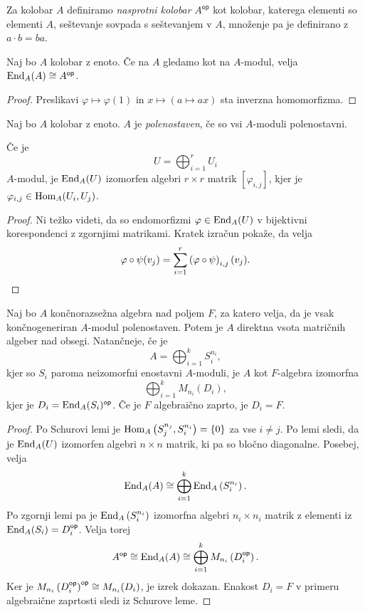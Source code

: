 \begin{definicija}
Za kolobar $A$ definiramo
\emph{nasprotni kolobar} $A^{\mathsf{op}}$
kot kolobar, katerega elementi so elementi $A$, seštevanje sovpada
s seštevanjem v $A$, množenje pa je definirano z $a \cdot b = ba$.
\end{definicija}

\begin{lema}
Naj bo $A$ kolobar z enoto. Če na $A$ gledamo kot na $A$-modul,
velja $\operatorname{End}_A(A) \cong A^{\mathsf{op}}$.
\end{lema}

\begin{proof}
Preslikavi $\varphi \mapsto \varphi(1)$ in
$x \mapsto (a \mapsto ax)$ sta inverzna homomorfizma.
\end{proof}

\begin{definicija}
Naj bo $A$ kolobar z enoto. $A$ je
\emph{polenostaven}, če so vsi
$A$-moduli polenostavni.
\end{definicija}

\begin{lema}
Če je
\[
U = \bigoplus_{i=1}^r U_i
\]
$A$-modul, je $\operatorname{End}_A(U)$ izomorfen algebri $r \times r$ matrik
$[\varphi_{i,j}]$, kjer je $\varphi_{i,j} \in \operatorname{Hom}_A(U_i, U_j)$.
\end{lema}

\begin{proof}
Ni težko videti, da so endomorfizmi $\varphi \in \operatorname{End}_A(U)$ v
bijektivni korespondenci z zgornjimi matrikami. Kratek izračun
pokaže, da velja
\[
\varphi \circ \psi(v_j) =
\sum_{i=1}^r \left(\varphi \circ \psi\right)_{i,j}(v_j). \qedhere
\]
\end{proof}

\begin{izrek}
Naj bo $A$ končnorazsežna algebra nad poljem $F$, za katero velja,
da je vsak končnogeneriran $A$-modul polenostaven. Potem je $A$
direktna vsota matričnih algeber nad obsegi. Natančneje, če je
\[
A = \bigoplus_{i=1}^k S_i^{n_i},
\]
kjer so $S_i$ paroma neizomorfni enostavni $A$-moduli, je $A$ kot
$F$-algebra izomorfna
\[
\bigoplus_{i=1}^k M_{n_i}(D_i),
\]
kjer je $D_i = \operatorname{End}_A(S_i)^{\mathsf{op}}$. Če je $F$ algebraično
zaprto, je $D_i = F$.
\end{izrek}

\begin{proof}
Po Schurovi lemi je $\operatorname{Hom}_A \left(S_j^{n_j}, S_i^{n_i}\right) = \left\{0\right\}$ za
vse $i \ne j$. Po lemi sledi, da je $\operatorname{End}_A(U)$ izomorfen algebri
$n \times n$ matrik, ki pa so bločno diagonalne. Posebej, velja
\[
\operatorname{End}_A(A) \cong \bigoplus_{i=1}^k \operatorname{End}_A \left(S_i^{n_i}\right).
\]
Po zgornji lemi pa je $\operatorname{End}_A \left(S_i^{n_i}\right)$ izomorfna algebri
$n_i \times n_i$ matrik z elementi iz
$\operatorname{End}_A(S_i) = D_i^{\mathsf{op}}$. Velja torej
\[
A^{\mathsf{op}} \cong
\operatorname{End}_A(A) \cong
\bigoplus_{i=1}^k M_{n_i} \left(D_i^{\mathsf{op}}\right).
\]
Ker je
$M_{n_i} \left(D_i^{\mathsf{op}}\right)^{\mathsf{op}} \cong M_{n_i}(D_i)$,
je izrek dokazan. Enakost $D_i = F$ v primeru algebraične zaprtosti
sledi iz Schurove leme.
\end{proof}

